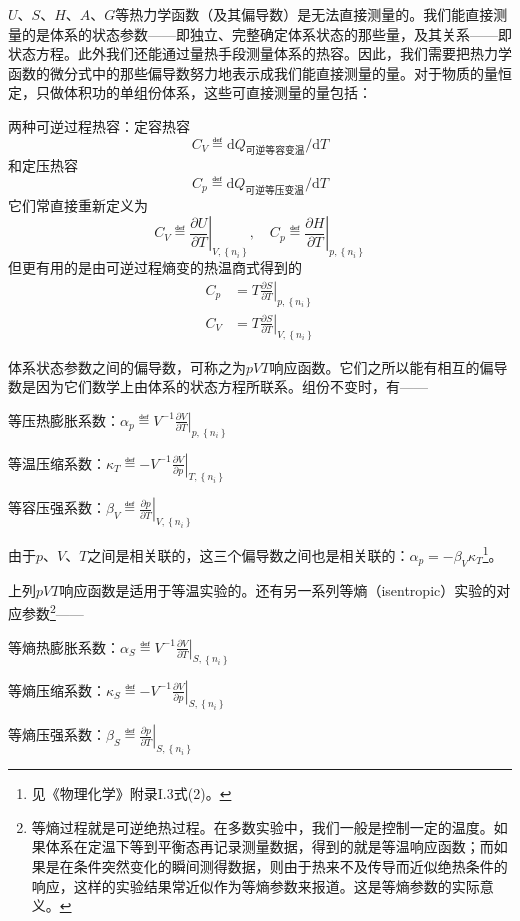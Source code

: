 \documentclass[main.tex]{subfiles}
\begin{document}
$U$、$S$、$H$、$A$、$G$等热力学函数（及其偏导数）是无法直接测量的。我们能直接测量的是体系的状态参数——即独立、完整确定体系状态的那些量，及其关系——即状态方程。此外我们还能通过量热手段测量体系的热容。因此，我们需要把热力学函数的微分式中的那些偏导数努力地表示成我们能直接测量的量。对于物质的量恒定，只做体积功的单组份体系，这些可直接测量的量包括：

两种可逆过程热容：定容热容
\[C_V\eqdef\mathrm{d} Q_\text{可逆等容变温}/\mathrm{d}T\]
和定压热容
\[C_p\eqdef\mathrm{d} Q_\text{可逆等压变温}/\mathrm{d}T\]
它们常直接重新定义为
\[C_V\eqdef\left.\frac{\partial U}{\partial T}\right|_{V,\left\{n_i\right\}},\quad C_p\eqdef\left.\frac{\partial H}{\partial T}\right|_{p,\left\{n_i\right\}}\]
但更有用的是由可逆过程熵变的热温商式得到的
\begin{align}
    C_p & =T\left.\frac{\partial S}{\partial T}\right|_{p,\left\{n_i\right\}} \\
    C_V & =T\left.\frac{\partial S}{\partial T}\right|_{V,\left\{n_i\right\}}
\end{align}

体系状态参数之间的偏导数，可称之为$pVT$响应函数。它们之所以能有相互的偏导数是因为它们数学上由体系的状态方程所联系。组份不变时，有——

等压热膨胀系数：$\alpha_p\eqdef V^{-1}\left.\frac{\partial V}{\partial T}\right|_{p,\left\{n_i\right\}}$

等温压缩系数：$\kappa_T\eqdef-V^{-1}\left.\frac{\partial V}{\partial p}\right|_{T,\left\{n_i\right\}}$

等容压强系数：$\beta_V\eqdef\left.\frac{\partial p}{\partial T}\right|_{V,\left\{n_i\right\}}$

由于$p$、$V$、$T$之间是相关联的，这三个偏导数之间也是相关联的：$\alpha_p=-\beta_V\kappa_T$\footnote{见《物理化学》附录I.3式(2)。}。

上列$pVT$响应函数是适用于等温实验的。还有另一系列等熵（isentropic）实验的对应参数\footnote{等熵过程就是可逆绝热过程。在多数实验中，我们一般是控制一定的温度。如果体系在定温下等到平衡态再记录测量数据，得到的就是等温响应函数；而如果是在条件突然变化的瞬间测得数据，则由于热来不及传导而近似绝热条件的响应，这样的实验结果常近似作为等熵参数来报道。这是等熵参数的实际意义。}——

等熵热膨胀系数：$\alpha_S\eqdef V^{-1}\left.\frac{\partial V}{\partial T}\right|_{S,\left\{n_i\right\}}$

等熵压缩系数：$\kappa_S\eqdef -V^{-1}\left.\frac{\partial V}{\partial p}\right|_{S,\left\{n_i\right\}}$

等熵压强系数：$\beta_S\eqdef\left.\frac{\partial p}{\partial T}\right|_{S,\left\{n_i\right\}}$
\end{document}
